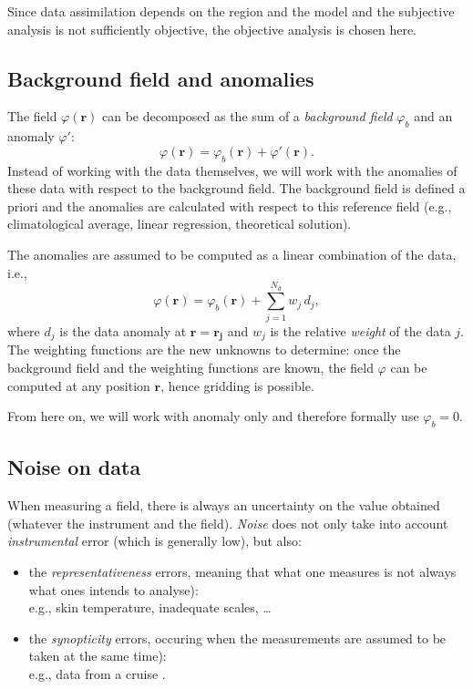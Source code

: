 Since data assimilation depends on the region and the model and the subjective analysis is not sufficiently objective, the objective analysis is chosen here. 

\subsection{Background field and anomalies}

The field $\varphi(\mathbf{r})$ can be decomposed as the sum of a \textit{background field}  $\varphi_b$ and an anomaly $\varphi'$: 
\begin{equation}
 \varphi(\mathbf{r}) = \varphi_b(\mathbf{r}) + \varphi'(\mathbf{r}).
 \label{background}
\end{equation}
Instead of working with the data themselves, we will work with the anomalies of these data with respect to the background field. The background field is defined a priori and the anomalies are calculated with respect to this reference field (e.g., climatological average, linear regression, theoretical solution). 

The anomalies are assumed to be computed as a linear combination of the data, i.e., 
\begin{equation}
\varphi(\mathbf{r}) = \varphi_b(\mathbf{r}) + \sum_{j=1}^{N_d} w_j\, d_j,
\label{objectiveanal}
\end{equation}
where $d_{j}$ is the data anomaly at $\mathbf{r}= \mathbf{r_{j}}$ and $w_j$ is the relative \textit{weight}  of the data $j$. The weighting functions are the new unknowns to determine: once the background field and the weighting functions are known, the field $\varphi$ can be computed at any position $\mathbf{r}$, hence gridding is possible.

From here on, we will work with anomaly only and therefore formally use $\varphi_{b}=0$.

\subsection{Noise on data}

When measuring a field, there is always an uncertainty on the value obtained (whatever the instrument and the field). \textit{Noise}  does not only take into account \textit{instrumental} error (which is generally low), but also:
\begin{itemize}
\item the \textit{representativeness} errors, meaning that what one measures is not always what ones intends to analyse):\\
e.g., skin temperature, inadequate scales, \ldots
\item the \textit{synopticity} errors, occuring when the measurements are assumed to be taken at the same time):\\
e.g., data from a cruise \citep{RIXEN01}.
\end{itemize}

